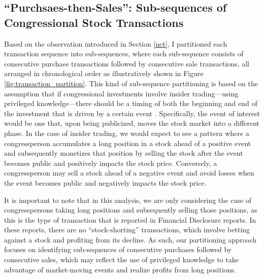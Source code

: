 \documentclass[15pt,letterpaper]{article}
\begin{document}
\subsection{``Purchsaes-then-Sales'': Sub-sequences of Congressional Stock Transactions} \label{subsq}

Based on the observation introduced in Section \ref{uct}, I partitioned each transaction sequence into sub-sequences, where each sub-sequence consists of consecutive purchase transactions followed by consecutive sale transactions, all arranged in chronological order as illustratively shown in Figure \ref{fig:transaction_partition}. 
This kind of sub-sequence partitioning is based on the assumption that if congressional investments involve insider trading—using privileged knowledge—there should be a timing of both the beginning and end of the investment that is driven by a certain event \citep{event1, event2}. Specifically, the event of interest would be one that, upon being publicized, moves the stock market into a different phase. In the case of insider trading, we would expect to see a pattern where a congressperson accumulates a long position in a stock ahead of a positive event and subsequently monetizes that position by selling the stock after the event becomes public and positively impacts the stock price. Conversely, a congressperson may sell a stock ahead of a negative event and avoid losses when the event becomes public and negatively impacts the stock price.

It is important to note that in this analysis, we are only considering the case of congresspersons taking long positions and subsequently selling those positions, as this is the type of transaction that is reported in Financial Disclosure reports. In these reports, there are no ``stock-shorting'' transactions, which involve betting against a stock and profiting from its decline. As such, our partitioning approach focuses on identifying sub-sequences of consecutive purchases followed by consecutive sales, which may reflect the use of privileged knowledge to take advantage of market-moving events and realize profits from long positions.
\end{document}
